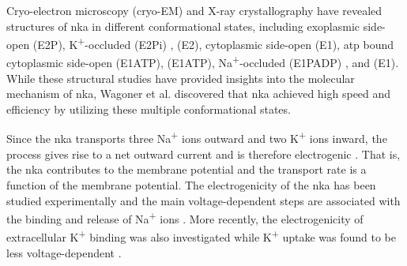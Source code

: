\documentclass{biophys-new}
\newcommand{\rev}[1]{{\color{black} #1}}
\begin{document}
\rev{Cryo-electron microscopy (cryo-EM) and X-ray crystallography have revealed structures of \Gls{nka} in different conformational states}, including exoplasmic side-open (\textrm{E2\textperiodcentered P})\cite{kanai_binding_2021,nguyen_structural_2022},
K\textsuperscript{+}-occluded (\textrm{E2\textperiodcentered [2K] \textperiodcentered Pi}) \cite{morth_crystal_2007,shinoda_crystal_2009,nguyen_structural_2022},
(\textrm{E2\textperiodcentered [2K]})\cite{guo_cryo-em_2022},
cytoplasmic side-open (\textrm{E1})\cite{nguyen_structural_2022}, \gls{atp} bound cytoplasmic side-open (\textrm{E1\textperiodcentered ATP})\cite{nguyen_structural_2022},
(\textrm{E1\textperiodcentered [3Na]\textperiodcentered ATP})\cite{guo_cryo-em_2022},
Na\textsuperscript{+}-occluded (\textrm{E1\textperiodcentered [3Na]\textperiodcentered P\text{-}ADP}) \cite{nyblom_crystal_2013,kanai_crystal_2013,nguyen_structural_2022},
and (\textrm{E1\textperiodcentered [3Na]})\cite{guo_cryo-em_2022}.
While these structural studies have provided insights into the molecular mechanism of \Gls{nka}, Wagoner et al. \cite{wagoner_mechanisms_2019} discovered that \gls{nka} achieved high speed and efficiency by utilizing these multiple conformational states.

Since the \Gls{nka} transports three Na\textsuperscript{+} ions outward and two K\textsuperscript{+} ions inward,
the process gives rise to a net outward current and is therefore electrogenic \cite{apell_electrogenic_1989,glitsch_electrophysiology_2001}.
That is, the \Gls{nka} contributes to the membrane potential and the transport rate is a function of the membrane potential.
The electrogenicity of the \Gls{nka} has been studied experimentally and the main voltage-dependent steps are associated with the binding and release of Na\textsuperscript{+} ions \cite{nakao_voltage_1986,gadsby_extracellular_1993,wuddel_electrogenicity_1995,domaszewicz_binding_1999,holmgren_three_2000,holmgren_charge_2006,stanley_intracellular_2016}.
More recently, the electrogenicity of extracellular K\textsuperscript{+} binding was also investigated \cite{peluffo_electrogenic_1997,castillo_mechanism_2015}
while K\textsuperscript{+} uptake was found to be less voltage-dependent \cite{moreno_transient_2020,castillo_mechanism_2015}.
\end{document}
